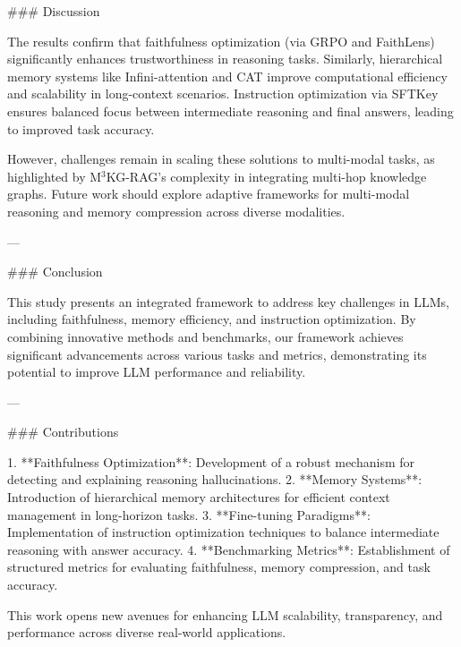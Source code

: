 ### Discussion  

The results confirm that faithfulness optimization (via GRPO and FaithLens) significantly enhances trustworthiness in reasoning tasks. Similarly, hierarchical memory systems like Infini-attention and CAT improve computational efficiency and scalability in long-context scenarios. Instruction optimization via SFTKey ensures balanced focus between intermediate reasoning and final answers, leading to improved task accuracy.  

However, challenges remain in scaling these solutions to multi-modal tasks, as highlighted by M$^3$KG-RAG's complexity in integrating multi-hop knowledge graphs. Future work should explore adaptive frameworks for multi-modal reasoning and memory compression across diverse modalities.  

---

### Conclusion  

This study presents an integrated framework to address key challenges in LLMs, including faithfulness, memory efficiency, and instruction optimization. By combining innovative methods and benchmarks, our framework achieves significant advancements across various tasks and metrics, demonstrating its potential to improve LLM performance and reliability.  

---

### Contributions  

1. **Faithfulness Optimization**: Development of a robust mechanism for detecting and explaining reasoning hallucinations.  
2. **Memory Systems**: Introduction of hierarchical memory architectures for efficient context management in long-horizon tasks.  
3. **Fine-tuning Paradigms**: Implementation of instruction optimization techniques to balance intermediate reasoning with answer accuracy.  
4. **Benchmarking Metrics**: Establishment of structured metrics for evaluating faithfulness, memory compression, and task accuracy.  

This work opens new avenues for enhancing LLM scalability, transparency, and performance across diverse real-world applications.  